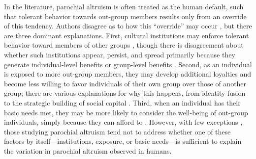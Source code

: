 \documentclass[bibauthoryear]{aa}
\begin{document}
In the literature, parochial altruism is often treated as the human default, such that tolerant behavior towards out-group members results only from an override of this tendency. %
 Authors disagree as to how this ``override'' may occur \citep{pisor2019evolution}, but there are three dominant explanations. First, cultural institutions may enforce tolerant behavior toward members of other groups \citep{fearon1996explaining, fry2018evolutionary}, though there is disagreement about whether such institutions appear, persist, and spread primarily because they generate individual-level benefits or group-level benefits \citep[see][for a useful discussion]{purzycki2020institutions}. Second, as an individual is exposed to more out-group members, they may develop additional loyalties and become less willing to favor individuals of their own group over those of another group; there are various explanations for why this happens, from identity fusion to the strategic building of social capital \citep{brewer1976ethnocentrism, beck2006cosmopolitan, buchan2009globalization, fukuyama2001social, hruschka2013economic, mau2008cosmopolitan, singer2011expanding}. Third, when an individual has their basic needs met, they may be more likely to consider the well-being of out-group individuals, simply because they can afford to \citep{hruschka2014impartial, silva2014cooperation}. However, with few exceptions \citep{hruschka2013economic, vardy2019property}, those studying parochial altruism tend not to address whether one of these factors by itself---institutions, exposure, or basic needs---is sufficient to explain the variation in parochial altruism observed in humans.
\end{document}
